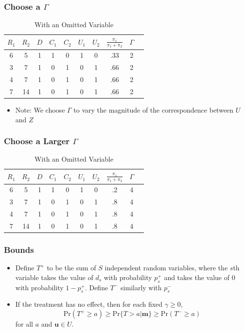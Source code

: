 \documentclass{beamer}
\begin{document}
\begin{frame}[c]\frametitle{Choose a $\Gamma$}
	\begin{table}
		\begin{center}
			\begin{tabular}{cccccccccc}
				$R_1$ & $R_2$ & $D$ & $C_1$ &$C_2$  & $U_1$ & $U_2$ & $\frac{\pi_1}{\pi_1 + \pi_2}$ & $\Gamma$\\ \hline
				6 & 5 & 1 & 1 & 0  & 1 & 0 &  .33 & 2\\
				3 & 7 & 1 & 0 & 1  & 0 & 1 & .66  & 2\\
				4 & 7 & 1 & 0 & 1  & 0 & 1 &  .66 & 2\\
				7 & 14 & 1 & 0 & 1  & 0 & 1 & .66 & 2\\
			\end{tabular}
		\end{center}
		\caption{With an Omitted Variable}
	\end{table}
\begin{itemize}
\item[] Note: We choose $\Gamma$ to vary the magnitude of the correspondence between $U$
  and $Z$
\end{itemize}
\end{frame}


\begin{frame}[c]\frametitle{Choose a Larger $\Gamma$}
	\begin{table}
		\begin{center}
			\begin{tabular}{cccccccccc}
				$R_1$ & $R_2$ & $D$ & $C_1$ &$C_2$  & $U_1$ & $U_2$ & $\frac{\pi_1}{\pi_1 + \pi_2}$ & $\Gamma$\\ \hline
				6 & 5 & 1 & 1 & 0  & 1 & 0 &  .2 & 4\\
				3 & 7 & 1 & 0 & 1  & 0 & 1 & .8  & 4\\
				4 & 7 & 1 & 0 & 1  & 0 & 1 &  .8 & 4\\
				7 & 14 & 1 & 0 & 1  & 0 & 1 & .8 & 4\\
			\end{tabular}
		\end{center}
		\caption{With an Omitted Variable}
	\end{table}
\end{frame}



  \begin{frame}
    \frametitle{Bounds}
    \begin{itemize}
    \item Define $T^+$ to be the sum of $S$ independent random
      variables, where the $s$th variable takes the value of $d_s$
      with probability $p^+_s$ and takes the value of 0 with
      probability $1-p^+_s$. Define $T^-$ similarly with $p^-_s$
   \item If the treatment has no effect, then for each fixed $\gamma \geq 0$,
$$\textrm{Pr}(T^+\geq a) \geq \textrm{Pr}\{T>a|\mathbf{m}\} \geq
\textrm{Pr}(T^- \geq a)$$
for all $a$ and $\mathbf{u} \in U$.
  \end{itemize}
  \end{frame}
\end{document}
